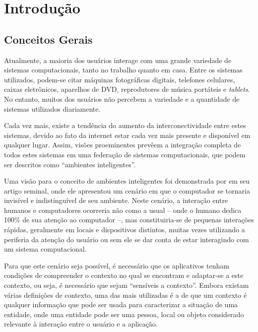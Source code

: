 \chapter{Introdução}
\label{ch:introducao}

\section{Conceitos Gerais}
\label{sec:conceitos}

Atualmente, a maioria dos usuários interage com uma grande variedade de sistemas computacionais, tanto no trabalho quanto em casa. Entre os sistemas utilizados, podem-se citar máquinas fotográficas digitais, telefones celulares, caixas eletrônicos, aparelhos de DVD, reprodutores de música portáteis e {\em tablets}. No entanto, muitos dos usuários não percebem a variedade e a quantidade de sistemas utilizados diariamente.

Cada vez mais, existe a tendência do aumento da interconectividade entre estes sistemas, devido ao fato da internet estar cada vez mais presente e disponível em qualquer lugar. Assim, visões proeminentes prevêem a integração completa de todos estes sistemas em uma federação de sistemas computacionais, que podem ser descritos como ``ambientes inteligentes''. \cite{heckmann05}

Uma visão para o conceito de ambientes inteligentes foi demonstrada por  em seu artigo seminal, onde ele apresentou um cenário em que o computador se tornaria invisível e indistinguível de seu ambiente. Neste cenário, a interação entre humanos e computadores ocorreria não como a usual -- onde o humano dedica 100\% de sua atenção ao computador --, mas constituiria-se de pequenas interações rápidas, geralmente em locais e dispositivos distintos, muitas vezes utilizando a periferia da atenção do usuário \cite{weiser96} ou sem ele se dar conta de estar interagindo com um sistema computacional.

Para que este cenário seja possível, é necessário que os aplicativos tenham condições de compreender o contexto no qual se encontram e adaptar-se a este contexto, ou seja, é necessário que sejam ``sensíveis a contexto''. Embora existam várias definições de contexto, uma das mais utilizadas é a de que um contexto é qualquer informação que pode ser usada para caracterizar a situação de uma entidade, onde uma entidade pode ser uma pessoa, local ou objeto considerado relevante à interação entre o usuário e a aplicação. \cite{dey2001}

